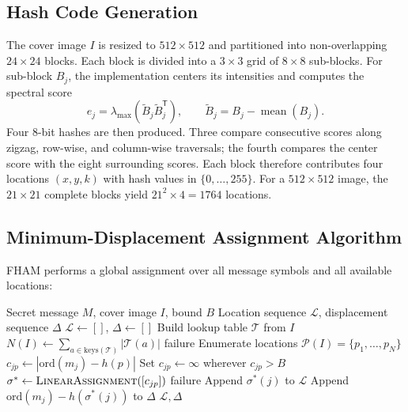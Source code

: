 \documentclass[preprint,12pt]{elsarticle}
\theoremstyle{plain}
\begin{document}
\subsection{Hash Code Generation}

The cover image $I$ is resized to $512 \times 512$ and partitioned into
non-overlapping $24\times24$ blocks. Each block is divided into a $3\times3$
grid of $8\times8$ sub-blocks. For sub-block $B_j$, the implementation centers
its intensities and computes the spectral score
\begin{equation}
    e_j=\lambda_{\max}(\widetilde{B}_j\widetilde{B}_j^{\mathsf T}),
    \qquad \widetilde{B}_j=B_j-\operatorname{mean}(B_j).
\end{equation}
Four 8-bit hashes are then produced. Three compare consecutive scores along
zigzag, row-wise, and column-wise traversals; the fourth compares the center
score with the eight surrounding scores. Each block therefore contributes four
locations $(x,y,k)$ with hash values in $\{0,\ldots,255\}$. For a
$512\times512$ image, the $21\times21$ complete blocks yield
$21^2\times4=1764$ locations.

\subsection{Minimum-Displacement Assignment Algorithm}

FHAM performs a global assignment over all message symbols and all available
locations:

\begin{algorithm}[!t]
    \caption{FHAM Bounded Intra-Cover Assignment}
    \label{alg:embed}
    \begin{algorithmic}[1]
        \Require Secret message $M$, cover image $I$, bound $B$
        \Ensure Location sequence $\mathcal{L}$, displacement sequence $\Delta$
        \State $\mathcal{L} \gets []$, $\Delta \gets []$
        \State Build lookup table $\mathcal{T}$ from $I$
        \State $N(I) \gets \sum_{a \in \mathrm{keys}(\mathcal{T})} |\mathcal{T}(a)|$
            \State \Return failure
        \EndIf
        \State Enumerate locations $\mathcal{P}(I)=\{p_1,\ldots,p_N\}$
        \State $c_{jp}\gets|\text{ord}(m_j)-h(p)|$
        \State Set $c_{jp}\gets\infty$ wherever $c_{jp}>B$
        \State $\sigma^*\gets\textsc{LinearAssignment}([c_{jp}])$
            \State \Return failure
        \EndIf
            \State Append $\sigma^*(j)$ to $\mathcal{L}$
            \State Append $\text{ord}(m_j)-h(\sigma^*(j))$ to $\Delta$
        \EndFor
        \State \Return $\mathcal{L},\Delta$
    \end{algorithmic}
\end{algorithm}
\end{document}
